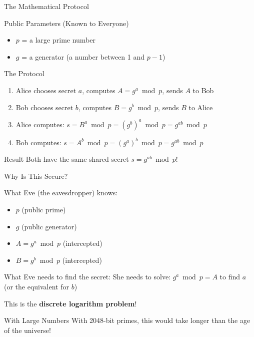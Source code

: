 \documentclass{beamer}
\begin{document}
\begin{frame}{The Mathematical Protocol}
\begin{block}{Public Parameters (Known to Everyone)}
\begin{itemize}
    \item $p$ = a large prime number
    \item $g$ = a generator (a number between 1 and $p-1$)
\end{itemize}
\end{block}

\pause

\begin{block}{The Protocol}
\begin{enumerate}
    \item Alice chooses secret $a$, computes $A = g^a \bmod p$, sends $A$ to Bob
    \item Bob chooses secret $b$, computes $B = g^b \bmod p$, sends $B$ to Alice
    \item Alice computes: $s = B^a \bmod p = (g^b)^a \bmod p = g^{ab} \bmod p$
    \item Bob computes: $s = A^b \bmod p = (g^a)^b \bmod p = g^{ab} \bmod p$
\end{enumerate}
\end{block}

\pause

\begin{exampleblock}{Result}
Both have the same shared secret $s = g^{ab} \bmod p$!
\end{exampleblock}
\end{frame}

\begin{frame}{Why Is This Secure?}
\begin{block}{What Eve (the eavesdropper) knows:}
\begin{itemize}
    \item $p$ (public prime)
    \item $g$ (public generator)
    \item $A = g^a \bmod p$ (intercepted)
    \item $B = g^b \bmod p$ (intercepted)
\end{itemize}
\end{block}

\pause

\begin{alertblock}{What Eve needs to find the secret:}
She needs to solve: $g^a \bmod p = A$ to find $a$ (or the equivalent for $b$)

This is the \textbf{discrete logarithm problem}!
\end{alertblock}

\pause

\begin{block}{With Large Numbers}
With 2048-bit primes, this would take longer than the age of the universe!
\end{block}
\end{frame}
\end{document}
